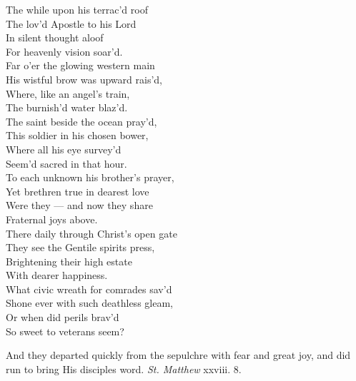   The while upon his terrac’d roof \\
 The lov’d Apostle to his Lord \\
 In silent thought aloof \\
 For heavenly vision soar’d. \\
  Far o’er the glowing western main \\
 His wistful brow was upward rais’d, \\
 Where, like an angel’s train, \\
 The burnish’d water blaz’d. \\
  The saint beside the ocean pray’d, \\
 This soldier in his chosen bower, \\
 Where all his eye survey’d \\
 Seem’d sacred in that hour. \\
  To each unknown his brother’s prayer, \\
 Yet brethren true in dearest love \\
 Were they — and now they share \\
 Fraternal joys above. \\
  There daily through Christ’s open gate \\
 They see the Gentile spirits press, \\
 Brightening their high estate \\
 With dearer happiness. \\
  What civic wreath for comrades sav’d \\
 Shone ever with such deathless gleam, \\
 Or when did perils brav’d \\
 So sweet to veterans seem?\\


And they departed quickly from the sepulchre with fear and great joy, and did run to bring His disciples word. \emph{St. Matthew} xxviii. 8.


